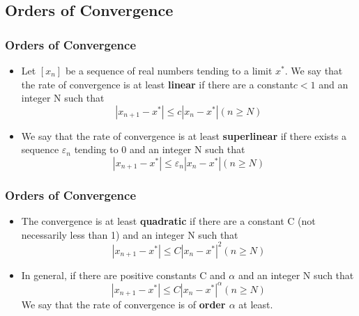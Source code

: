 \documentclass[notheorems,mathserif,table,compress]{beamer}  %
\begin{document}
\subsection{Orders of Convergence} 
\begin{frame}
  \frametitle{Orders of Convergence}
  \begin{itemize}
  \item Let $[ x_n ]$ be a sequence of real numbers tending to a limit $x^*$. We say
that the rate of convergence is at least \textbf{linear} if there are a constant$ c < 1$ and an
integer N such that   
\begin{displaymath}
 |x_{n+1}-x^*|\leq  c|x_n-x^*|   (n\geq  N)
\end{displaymath}

  \item   We say that the rate of convergence is at least \textbf{superlinear} if there exists a sequence
$\varepsilon_{n}$ tending to 0 and an integer N such that  
\begin{displaymath}
|x_{n+1}-x^*|\leq  \varepsilon_n|x_n-x^*|  (n\geq  N)
\end{displaymath}
  \end{itemize}
  
\end{frame}

\begin{frame}
  \frametitle{Orders of Convergence}
 \begin{itemize}
\item The convergence is at least \textbf{quadratic} if there are a constant C (not necessarily less
than 1) and an integer N such that    
\begin{displaymath}
|x_{n+1}-x^*|\leq  C|x_n-x^*|^2  (n\geq  N)
\end{displaymath}
 
\item In general, if there are positive constants C and $\alpha$ and an integer N such that 
\begin{displaymath}
 |x_{n+1}-x^*|\leq  C|x_n-x^*|^\alpha  (n\geq  N)
\end{displaymath}
 We say that the rate of convergence is of \textbf{order $\alpha$}  at least.
  \end{itemize}

\end{frame}
\end{document}
